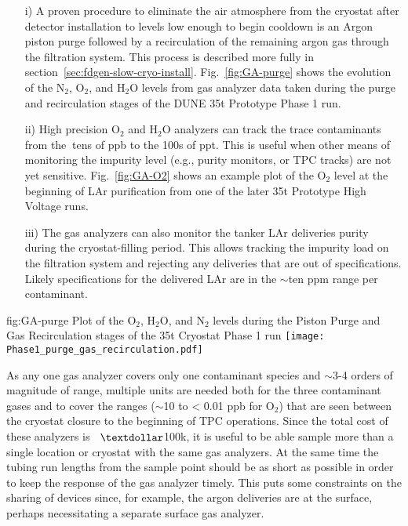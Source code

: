 \begin{enumerate}
\item[i)] A proven procedure to eliminate the air atmosphere from the cryostat after detector installation to levels low enough to begin cooldown is an Argon piston purge followed by a recirculation of the remaining argon gas through the filtration system. This process is described more fully in section~\ref{sec:fdgen-slow-cryo-install}. Fig.~\ref{fig:GA-purge} shows the evolution of the $\text{N}_2$, $\text{O}_2$, and $\text{H}_2\text{O}$ levels from gas analyzer data taken during the purge and recirculation stages of the DUNE \num{35}\si{t} Prototype Phase 1 run.

\item[ii)] High precision $\text{O}_2$ and $\text{H}_2\text{O}$ analyzers can track the trace contaminants from the $\>$tens of ppb to the 100s of ppt. This is useful when other means of monitoring the impurity level (e.g., purity monitors, or TPC tracks) are not yet sensitive. Fig.~\ref{fig:GA-O2} shows an example plot of the $\text{O}_2$ level at the beginning of LAr purification from one of the later \num{35}\si{t} Prototype High Voltage runs.

\item[iii)] The gas analyzers can also monitor the tanker LAr deliveries purity during the cryostat-filling period. This allows tracking the impurity load on the filtration system and rejecting any deliveries that are out of specifications. Likely specifications for the delivered LAr are in the $\sim$ten ppm range per contaminant.

\end{enumerate}

\begin{dunefigure}{fig:GA-purge}
  {Plot of the $\text{O}_2$, $\text{H}_2\text{O}$, and $\text{N}_2$ levels during the Piston Purge and Gas Recirculation stages of the \num{35}\si{t} Cryostat Phase 1 run}
  \texttt{[image: Phase1\_purge\_gas\_recirculation.pdf]}%
\end{dunefigure}

As any one gas analyzer covers only one contaminant species and $\sim$3-4 orders of magnitude of range, multiple units are needed both for the three contaminant gases and to cover the ranges ($\sim$10 to < 0.01 ppb for $\text{O}_2$) that are seen between the cryostat closure to the beginning of TPC operations. Since the total cost of these analyzers is $\>$ $\textdollar$100k, it is useful to be able sample more than a single location or cryostat with the same gas analyzers. At the same time the tubing run lengths from the sample point should be as short as possible in order to keep the response of the gas analyzer timely. This puts some constraints on the sharing of devices since, for example, the argon deliveries are at the surface, perhaps necessitating a separate surface gas analyzer.

